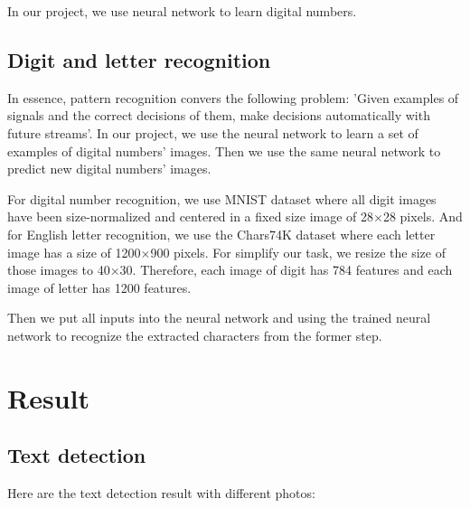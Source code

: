 \documentclass[paper=a4, french, 11pt]{scrartcl}
\begin{document}
In our project, we use neural network to learn digital numbers.

\subsection{Digit and letter recognition} \mbox{} \vspace{-0.5cm}

In essence, pattern recognition convers the following problem: 'Given examples of signals and the correct decisions of them, make decisions automatically with future streams'. In our project, we use the neural network to learn a set of examples of digital numbers' images. Then we use the same neural network to predict new digital numbers' images. 

For digital number recognition, we use MNIST dataset \cite{lecun1998gradient} where all digit images have been size-normalized and centered in a fixed size image of 28$\times$28 pixels. And for English letter recognition, we use the Chars74K dataset \cite{de2009character} where each letter image has a size of 1200$\times$900 pixels. For simplify our task, we resize the size of those images to 40$\times$30. Therefore, each image of digit has 784 features and each image of letter has 1200 features.

Then we put all inputs into the neural network and using the trained neural network to recognize the extracted characters from the former step.

\section{Result} \mbox{} \vspace{-0.5cm}

\subsection{Text detection} \mbox{} \vspace{-0.5cm}

Here are the text detection result with different photos:
\end{document}
